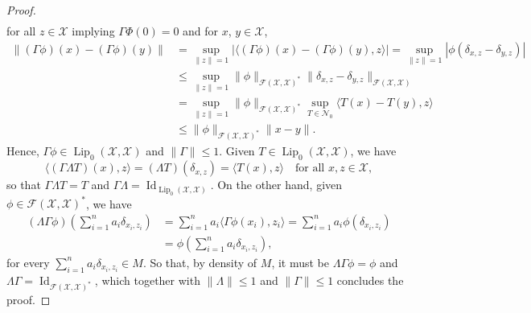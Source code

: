 \documentclass[onefignum,onetabnum]{siamonline250211}
\newcommand{\Id}{\operatorname{Id}}
\newcommand{\Lip}{\operatorname{Lip}}
\newcommand{\cX}{\mathcal{X}}
\begin{document}
\begin{proof}
\begin{equation*}
\begin{aligned}
    \end{aligned}
\end{equation*}
for all $z \in \cX$ implying $\Gamma\Phi(0)=0$ and for $x$, $y\in\cX$,
\begin{equation*}
    \begin{aligned}
\|(\Gamma \phi)(x)-(\Gamma \phi)(y)\| & = \sup_{\|z\|=1} |\langle (\Gamma \phi)(x)-(\Gamma \phi) (y), z\rangle| = \sup_{\|z\|=1} |\phi(\delta_{x,z}-\delta_{y,z})|\\
& \leq \sup_{\|z\|=1}\|\phi\|_{\mathcal{F}(\cX,\cX)^*}\|\delta_{x,z}-\delta_{y,z}\|_{\mathcal{F}(\cX,\cX)} \\ & = \sup_{\|z\|=1}\|\phi\|_{\mathcal{F}(\cX,\cX)^*} \sup_{T\in \mathcal{N}_0}\langle T(x)-T(y), z \rangle \\ & \leq \|\phi\|_{\mathcal{F}(\cX,\cX)^*} \|x-y\|.
    \end{aligned}
\end{equation*}
Hence, $\Gamma \phi \in \Lip_0(\cX,\cX)$ and $\|\Gamma\|\leq 1$. Given $T\in \Lip_0(\cX,\cX)$, we have
\[\langle (\Gamma \Lambda T) (x), z\rangle =(\Lambda T)(\delta_{x,z})=\langle T(x), z \rangle \quad \text{for all } x, z \in \cX,\]
so that $\Gamma \Lambda T = T$ and $\Gamma\Lambda=\Id_{\Lip_0(\cX,\cX)}$. On the other hand, given $\phi \in \mathcal{F}(\cX,\cX)^*$, we have
\[\begin{aligned}
    (\Lambda \Gamma \phi) \left(\sum_{i=1}^na_i\delta_{x_i,z_i}\right) & = \sum_{i=1}^n a_i \langle \Gamma \phi (x_i), z_i\rangle = \sum_{i=1}^n a_i \phi(\delta_{x_i,z_i}) \\
    &= \phi \left(\sum_{i=1}^na_i\delta_{x_i,z_i}\right),
    \end{aligned}\]
for every $\sum_{i=1}^{n} a_i \delta_{x_i,z_i} \in M$. So that, by density of $M$, it must be $\Lambda \Gamma\phi=\phi$ and $\Lambda \Gamma = \Id_{\mathcal{F}(\cX,\cX)^*}$, which together with $\|\Lambda\| \leq 1$ and $\|\Gamma\| \leq 1$ concludes the proof.
\end{proof}
\end{document}
